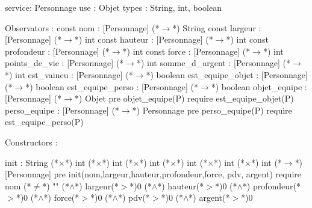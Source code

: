 \documentclass[a4paper, 11pt]{report}
\begin{document}
\begin{Spe}
service: Personnage
use : Objet
types : String, int, boolean

Observators : 
	const nom : [Personnage] (*$\rightarrow$*) String
	const largeur : [Personnage] (*$\rightarrow$*) int
	const hauteur : [Personnage] (*$\rightarrow$*) int
	const profondeur : [Personnage] (*$\rightarrow$*) int
	const force : [Personnage] (*$\rightarrow$*) int 
	points_de_vie : [Personnage] (*$\rightarrow$*) int
	somme_d_argent : [Personnage] (*$\rightarrow$*) int 
	est_vaincu : [Personnage] (*$\rightarrow$*) boolean 
	est_equipe_objet : [Personnage] (*$\rightarrow$*) boolean
        est_equipe_perso : [Personnage] (*$\rightarrow$*) boolean 
	objet_equipe : [Personnage] (*$\rightarrow$*) Objet
		pre objet_equipe(P) require est_equipe_objet(P)
        perso_equipe : [Personnage] (*$\rightarrow$*) Personnage
		pre perso_equipe(P) require est_equipe_perso(P) 

Constructors : 

	init : String (*$\times$*) int (*$\times$*) int (*$\times$*) int (*$\times$*) int (*$\times$*) int (*$\times$*) int (*$\rightarrow$*) [Personnage]
		pre init(nom,largeur,hauteur,profondeur,force, pdv, argent) require nom (*$\ne$*) "" (*$\land$*) largeur(*$>$*)0 (*$\land$*) hauteur(*$>$*)0 (*$\land$*) profondeur(*$>$*)0 (*$\land$*) force(*$>$*)0 (*$\land$*) pdv(*$>$*)0 (*$\land$*) argent(*$>$*)0 


\end{Spe}
\end{document}

